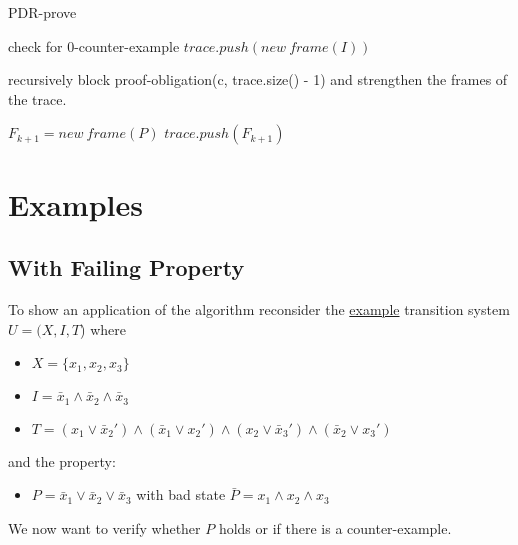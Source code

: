 \documentclass[11pt, a4paper, BCOR=10mm, ngerman, oneside]{scrbook}
\begin{document}
\begin{algorithm}[H] 
\caption{PDR-prove}
\begin{algorithmic}[1]
\State check for 0-counter-example
\State $trace.push(new\ frame(I))$
\Statex
\Loop

	\State recursively block proof-obligation(c, trace.size() - 1)
	\State and strengthen the frames of the trace.
	
	 
	\EndIf
	\EndWhile

	\Statex	
	
	\State $F_{k+1} = new\ frame(P)$
	\EndIf
\EndFor
	\EndIf
	\State $trace.push(F_{k+1})$

\EndLoop
\EndProcedure
\end{algorithmic}
\end{algorithm}

\section{Examples}
 
\subsection{With Failing Property} 
To show an application of the algorithm reconsider the \hyperref[ex1]{example} transition system $U = (X, I, T$) where \par
\begin{itemize}
\item $X = \{x_1, x_2, x_3\}$
\item $I = \bar x_1 \land \bar x_2 \land \bar x_3$
\item $T = (x_1 \lor \bar x_2' ) \land ( \bar x_1 \lor x_2') \land (x_2 \lor \bar x_3') \land ( \bar x_2 \lor x_3')$
\end{itemize}
and the property: 
\begin{itemize}
\item $P = \bar x_1 \lor \bar x_2 \lor \bar x_3$ with bad state $\bar P = x_1 \land x_2 \land x_3$ 
\end{itemize}
We now want to verify whether $P$ holds or if there is a counter-example. \\ \\
\end{document}
